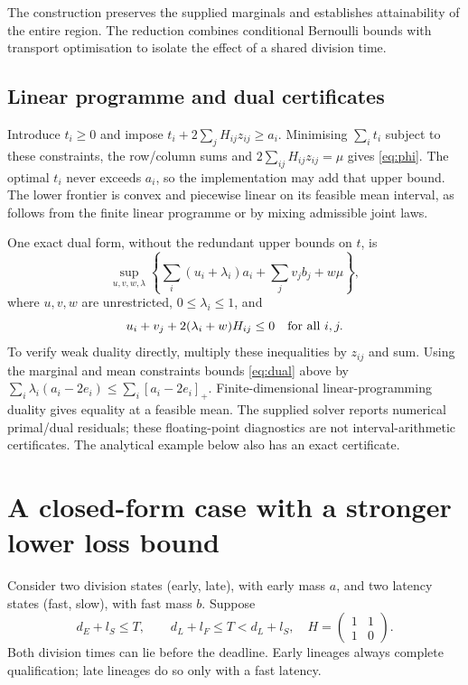 \documentclass[11pt]{article}
\begin{document}
The construction preserves the supplied marginals and establishes attainability of the entire region. The reduction combines conditional Bernoulli bounds with transport optimisation to isolate the effect of a shared division time.

\subsection{Linear programme and dual certificates}
Introduce $t_i\geq0$ and impose $t_i+2\sum_jH_{ij}z_{ij}\geq a_i$. Minimising $\sum_i t_i$ subject to these constraints, the row/column sums and $2\sum_{ij}H_{ij}z_{ij}=\mu$ gives \eqref{eq:phi}. The optimal $t_i$ never exceeds $a_i$, so the implementation may add that upper bound. The lower frontier is convex and piecewise linear on its feasible mean interval, as follows from the finite linear programme or by mixing admissible joint laws.

One exact dual form, without the redundant upper bounds on $t$, is
\begin{equation}
 \sup_{u,v,w,\lambda}\left\{\sum_i(u_i+\lambda_i)a_i+\sum_jv_jb_j+w\mu\right\},\label{eq:dual}
\end{equation}
where $u,v,w$ are unrestricted, $0\leq\lambda_i\leq1$, and
\begin{equation}
 u_i+v_j+2(\lambda_i+w)H_{ij}\leq0\quad\hbox{for all }i,j.
\end{equation}
To verify weak duality directly, multiply these inequalities by $z_{ij}$ and sum. Using the marginal and mean constraints bounds \eqref{eq:dual} above by $\sum_i\lambda_i(a_i-2e_i)\leq\sum_i[a_i-2e_i]_+$. Finite-dimensional linear-programming duality gives equality at a feasible mean. The supplied solver reports numerical primal/dual residuals; these floating-point diagnostics are not interval-arithmetic certificates. The analytical example below also has an exact certificate.

\section{A closed-form case with a stronger lower loss bound}
Consider two division states (early, late), with early mass $a$, and two latency states (fast, slow), with fast mass $b$. Suppose
\begin{equation}
 d_E+l_S\leq T,\qquad d_L+l_F\leq T<d_L+l_S,
 \quad H=\begin{pmatrix}1&1\\1&0\end{pmatrix}.\label{eq:two}
\end{equation}
Both division times can lie before the deadline. Early lineages always complete qualification; late lineages do so only with a fast latency.
\end{document}
